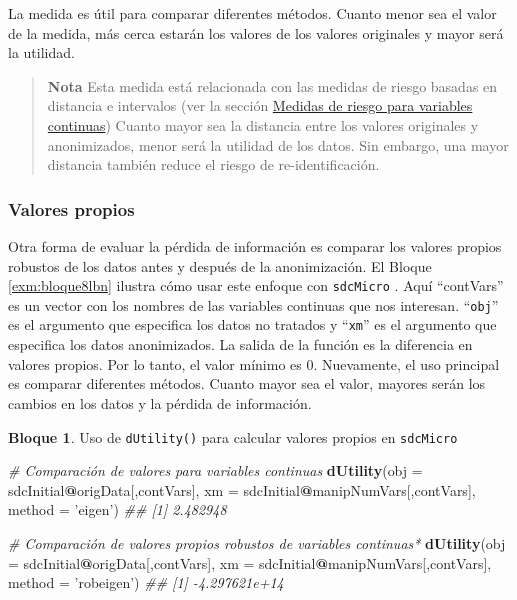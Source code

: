 \documentclass[]{book}
\newenvironment{Shaded}{\begin{snugshade}}{\end{snugshade}}
\newcommand{\CommentTok}[1]{\textcolor[rgb]{0.56,0.35,0.01}{\textit{#1}}}
\newcommand{\DataTypeTok}[1]{\textcolor[rgb]{0.13,0.29,0.53}{#1}}
\newcommand{\KeywordTok}[1]{\textcolor[rgb]{0.13,0.29,0.53}{\textbf{#1}}}
\newcommand{\NormalTok}[1]{#1}
\newcommand{\OperatorTok}[1]{\textcolor[rgb]{0.81,0.36,0.00}{\textbf{#1}}}
\newcommand{\StringTok}[1]{\textcolor[rgb]{0.31,0.60,0.02}{#1}}
\theoremstyle{definition}
\theoremstyle{definition}
\newtheorem{example}{Bloque}[chapter]
\theoremstyle{definition}
\theoremstyle{definition}
\theoremstyle{remark}
\begin{document}
La medida es útil para comparar diferentes métodos. Cuanto menor sea el valor de la medida, más cerca estarán los valores de los valores originales y mayor será la utilidad.

\begin{quote}
\textbf{Nota}
Esta medida está relacionada con las medidas de riesgo basadas en distancia e intervalos (ver la sección \protect\hyperlink{medidas-de-riesgo-para-variables-continuas}{Medidas de riesgo para variables continuas})
Cuanto mayor sea la distancia entre los valores originales y anonimizados, menor será la utilidad de los datos. Sin embargo, una mayor distancia también reduce el riesgo de re-identificación.
\end{quote}

\hypertarget{valores-propios}{%
\subsubsection{Valores propios}\label{valores-propios}}

Otra forma de evaluar la pérdida de información es comparar los valores propios robustos de los datos antes y después de la anonimización. El Bloque \ref{exm:bloque8lbn} ilustra cómo usar este enfoque con \texttt{sdcMicro} . Aquí ``contVars'' es un vector con los nombres de las variables continuas que nos interesan. ``\texttt{obj}'' es el argumento que
especifica los datos no tratados y ``\texttt{xm}'' es el argumento que especifica los datos anonimizados. La salida de la función es la diferencia en valores propios. Por lo tanto, el valor mínimo es 0. Nuevamente, el uso principal es comparar diferentes métodos. Cuanto mayor sea el valor, mayores serán los cambios en los datos y la pérdida de información.

\begin{example}
\protect\hypertarget{exm:bloque8lbn}{}{\label{exm:bloque8lbn} }Uso de \texttt{dUtility()} para calcular valores propios en \texttt{sdcMicro}
\end{example}

\begin{Shaded}
\begin{Highlighting}[]
\CommentTok{# Comparación de valores para variables continuas}
\KeywordTok{dUtility}\NormalTok{(}\DataTypeTok{obj =}\NormalTok{ sdcInitial}\OperatorTok{@}\NormalTok{origData[,contVars],}
         \DataTypeTok{xm =}\NormalTok{ sdcInitial}\OperatorTok{@}\NormalTok{manipNumVars[,contVars], }\DataTypeTok{method =} \StringTok{'eigen'}\NormalTok{)}
\CommentTok{## [1] 2.482948}

\CommentTok{# Comparación de valores propios robustos de variables continuas*}
\KeywordTok{dUtility}\NormalTok{(}\DataTypeTok{obj =}\NormalTok{ sdcInitial}\OperatorTok{@}\NormalTok{origData[,contVars],}
         \DataTypeTok{xm =}\NormalTok{ sdcInitial}\OperatorTok{@}\NormalTok{manipNumVars[,contVars], }\DataTypeTok{method =} \StringTok{'robeigen'}\NormalTok{)}
\CommentTok{## [1] -4.297621e+14}
\end{Highlighting}
\end{Shaded}
\end{document}
